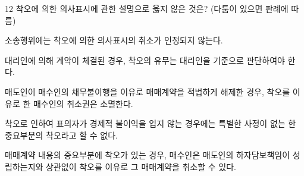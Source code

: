 \begin{question}{12}
착오에 의한 의사표시에 관한 설명으로 옳지 않은 것은? (다툼이 있으면 판례에 따름)
\begin{choices}
  \item 소송행위에는 착오에 의한 의사표시의 취소가 인정되지 않는다.
  \item 대리인에 의해 계약이 체결된 경우, 착오의 유무는 대리인을 기준으로 판단하여야 한다.
  \item 매도인이 매수인의 채무불이행을 이유로 매매계약을 적법하게 해제한 경우, 착오를 이유로 한 매수인의 취소권은 소멸한다.
  \item 착오로 인하여 표의자가 경제적 불이익을 입지 않는 경우에는 특별한 사정이 없는 한 중요부분의 착오라고 할 수 없다.
  \item 매매계약 내용의 중요부분에 착오가 있는 경우, 매수인은 매도인의 하자담보책임이 성립하는지와 상관없이 착오를 이유로 그 매매계약을 취소할 수 있다.
\end{choices}
\end{question}
